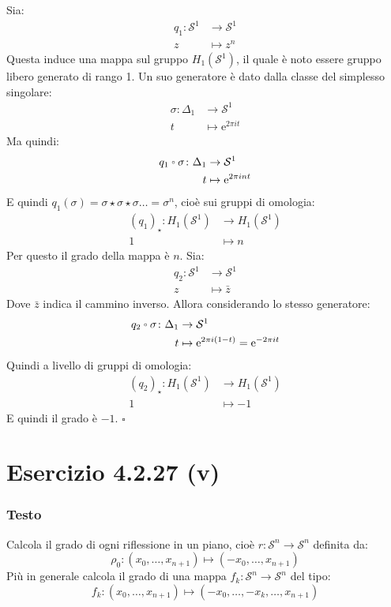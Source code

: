 \documentclass[10pt, toc=sectionentrywithdots]{scrartcl}
\newcommand{\Sph}[1][]{\mathcal{S}^#1}
\let\latexcirc=\circ
\newcommand{\ccirc}{\mathbin{\mathchoice
  {\xcirc\scriptstyle}
  {\xcirc\scriptstyle}
  {\xcirc\scriptscriptstyle}
  {\xcirc\scriptscriptstyle}
}}
\newcommand{\xcirc}[1]{\vcenter{\hbox{$#1\latexcirc$}}}
\let\circ\ccirc
\begin{document}
Sia:
\begin{align*}
  q_1 \colon  \Sph{1} &\to \Sph{1} \\
  z & \mapsto z^n
\end{align*}
Questa induce una mappa sul gruppo $ H_1(\Sph{1}) $,
il quale è noto essere gruppo libero generato di rango 1.
Un suo generatore è dato dalla classe del simplesso
singolare:
\begin{align*}
  \sigma \colon \Delta_1 & \to \Sph{1} \\
  t & \mapsto \mathrm{e}^{2 \pi i t}
\end{align*}
Ma quindi:
\begin{align*}
  q_1 \circ \sigma \colon \Delta_1 & \to \Sph{1} \\
  t & \mapsto \mathrm{e}^{2 \pi i n t}
\end{align*}
E quindi $ q_1(\sigma) = \sigma \star \sigma \star \sigma \dots = \sigma^n $, cioè sui gruppi
di omologia:
\begin{align*}
  (q_1)_\star \colon H_1(\Sph{1}) & \to H_1(\Sph{1}) \\
  1 & \mapsto n
\end{align*}
Per questo il grado della mappa è $ n $.
Sia:
\begin{align*}
  q_2 \colon  \Sph{1} & \to \Sph{1} \\
  z & \mapsto \bar{z}
\end{align*}
Dove $ \bar{z} $ indica il cammino inverso. Allora
considerando lo stesso generatore:
\begin{align*}
  q_2 \circ \sigma \colon  \Delta_1 & \to \Sph{1} \\
  t & \mapsto \mathrm{e}^{2 \pi i (1 - t)} = \mathrm{e}^{-2 \pi i t}
\end{align*}
Quindi a livello di gruppi di omologia:
\begin{align*}
  (q_2)_\star \colon H_1(\Sph{1}) & \to H_1(\Sph{1}) \\
  1 & \mapsto -1
\end{align*}
E quindi il grado è $ -1 $.
\hfill $ \square $

\section[4.2.27 (v)]{Esercizio 4.2.27 (v)}

\subsubsection*{Testo}
Calcola il grado di ogni riflessione in un piano, cioè $ r \colon \Sph{n} \to \Sph{n} $
definita da:
\[
  \rho_0 \colon (x_0, \dots, x_{n+1}) \mapsto (-x_0, \dots, x_{n+1})
\]
Più in generale calcola il grado di una mappa  $ f_k \colon \Sph{n} \to \Sph{n} $ del tipo:
\[
  f_k \colon (x_0, \dots, x_{n+1}) \mapsto (-x_0, \dots, -x_k, \dots, x_{n+1})
\]
\end{document}
